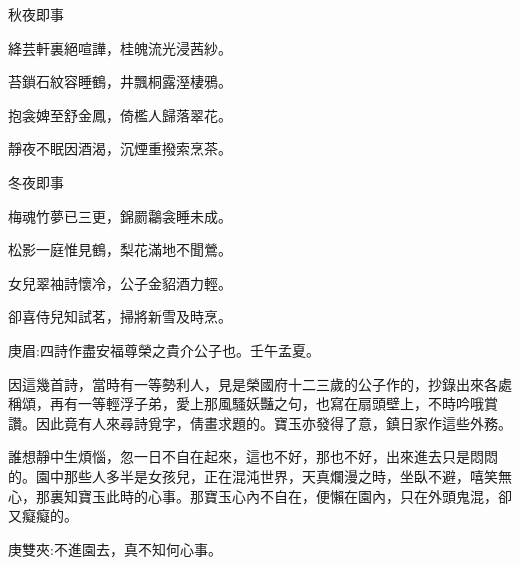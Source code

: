 \begin{poem}
    \begin{pl}秋夜即事\end{pl}

    \begin{pl}絳芸軒裏絕喧譁，桂魄流光浸茜紗。\end{pl}

    \begin{pl}苔鎖石紋容睡鶴，井飄桐露溼棲鴉。\end{pl}

    \begin{pl}抱衾婢至舒金鳳，倚檻人歸落翠花。\end{pl}

    \begin{pl}靜夜不眠因酒渴，沉煙重撥索烹茶。\end{pl}

\end{poem}


\begin{poem}
    \begin{pl}冬夜即事\end{pl}

    \begin{pl}梅魂竹夢已三更，錦罽鸘衾睡未成。\end{pl}

    \begin{pl}松影一庭惟見鶴，梨花滿地不聞鶯。\end{pl}

    \begin{pl}女兒翠袖詩懷冷，公子金貂酒力輕。\end{pl}

    \begin{pl}卻喜侍兒知試茗，掃將新雪及時烹。\end{pl}\begin{note}庚眉:四詩作盡安福尊榮之貴介公子也。壬午孟夏。\end{note}
\end{poem}


\begin{parag}
    因這幾首詩，當時有一等勢利人，見是榮國府十二三歲的公子作的，抄錄出來各處稱頌，再有一等輕浮子弟，愛上那風騷妖豔之句，也寫在扇頭壁上，不時吟哦賞讚。因此竟有人來尋詩覓字，倩畫求題的。寶玉亦發得了意，鎮日家作這些外務。
\end{parag}


\begin{parag}
    誰想靜中生煩惱，忽一日不自在起來，這也不好，那也不好，出來進去只是悶悶的。園中那些人多半是女孩兒，正在混沌世界，天真爛漫之時，坐臥不避，嘻笑無心，那裏知寶玉此時的心事。那寶玉心內不自在，便懶在園內，只在外頭鬼混，卻又癡癡的。\begin{note}庚雙夾:不進園去，真不知何心事。\end{note}
\end{parag}


